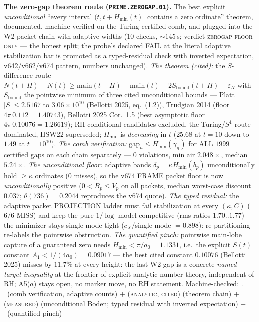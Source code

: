 \documentclass[11pt,a4paper]{article}
\theoremstyle{definition}
\begin{document}
\par\smallskip\noindent\textbf{The zero-gap theorem route
(\texttt{PRIME.ZEROGAP.01}).}
The best explicit \emph{unconditional} ``every interval
$(t, t+H_{\min}(t)]$ contains a zero ordinate'' theorem, documented,
machine-verified on the Turing-certified comb, and plugged into the
W2 packet chain with adaptive widths ($10$ checks, ${\sim}145$\,s;
verdict \textsc{zerogap-floor-only} --- the honest split; the probe's
declared FAIL at the literal adaptive stabilization bar is promoted
as a typed-residual check with inverted expectation, v642/v662/v674
pattern, numbers unchanged).  \emph{The theorem (cited):} the
$S$-difference route $N(t+H)-N(t)\ge\mathrm{main}(t+H)-
\mathrm{main}(t)-2S_{\mathrm{bound}}(t+H)-\varepsilon_N$ with
$S_{\mathrm{bound}}$ the pointwise minimum of three cited
unconditional bounds --- Platt $|S|\le2.5167$ to $3.06\times10^{10}$
(Bellotti 2025, eq.~(1.2)), Trudgian 2014 (floor
$4\pi\,0.112=1.40743$), Bellotti 2025 Cor.~1.5 (best asymptotic floor
$4\pi\,0.10076=1.26619$); RH-conditional candidates excluded, the
Turing/$S^1$ route dominated, HSW22 superseded; $H_{\min}$ is
\emph{decreasing} in $t$ ($25.68$ at $t=10$ down to $1.49$ at
$t=10^{10}$).  \emph{The comb verification:} $\mathrm{gap}_n\le
H_{\min}(\gamma_n)$ for ALL $1999$ certified gaps on each chain
separately --- $0$ violations, min air $2.048\times$, median
$5.24\times$.  \emph{The unconditional floor:} adaptive bands
$\delta_p=\kappa H_{\min}(b_p)$ unconditionally hold $\ge\kappa$
ordinates ($0$ misses), so the v674 FRAME packet floor is now
\emph{unconditionally} positive ($0<B_p\le V_p$ on all packets,
median worst-case discount $0.037$; $\theta(736)=0.2044$ reproduces
the v674 quote).  \emph{The typed residual:} the adaptive packet
PROJECTION ladder must fail stabilization at every $(\kappa,C)$
($6/6$ MISS) and keep the pure-$1/\log$ model competitive (rms ratios
$1.70..1.77$) --- the minimizer stays single-mode tight
($c_X/$single-mode $=0.898$): re-partitioning re-labels the pointwise
obstruction.  \emph{The quantified pinch:} pointwise main-lobe
capture of a guaranteed zero needs $H_{\min}<\pi/a_0=1.1331$, i.e.\
the explicit $S(t)$ constant $A_1<1/(4a_0)=0.09017$ --- the best
cited constant $0.10076$ (Bellotti 2025) misses by $11.7\%$ at every
height: the last W2 gap is a concrete \emph{named target inequality}
at the frontier of explicit analytic number theory, independent of
RH; A5($a$) stays open, no marker move, no RH statement.
Machine-checked: .
\mE\ (comb verification, adaptive counts) $+$ (\textsc{analytic,
cited}) (theorem chain) $+$ (\textsc{measured}) (unconditional
Boden; typed residual with inverted expectation) $+$ \mC\ (quantified
pinch)
\par\smallskip
\end{document}
